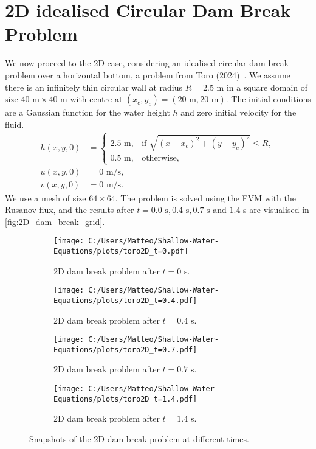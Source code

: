 \section{2D idealised Circular Dam Break Problem}\label{sec:2D_dam_break}
We now proceed to the 2D case, considering an idealised circular dam break problem over a horizontal bottom, a problem from Toro (2024)~\cite{Toro2024}.
We assume there is an infinitely thin circular wall at radius $R = 2.5$ m in a square domain of size $40 \text{ m} \times 40 \text{ m}$ with centre at $(x_c,y_c) = (20 \text{ m}, 20 \text{ m})$.
The initial conditions are a Gaussian function for the water height $h$ and zero initial velocity for the fluid.
\begin{align*}
    h(x,y,0) &= \begin{cases}
        2.5 \text{ m}, & \text{if } \sqrt{ {(x-x_c)}^2 + {(y-y_c)}^2 } \leq R, \\
        0.5 \text{ m}, & \text{otherwise},
    \end{cases} \\
    u(x,y,0) &= 0 \text{ m/s}, \\
    v(x,y,0) &= 0 \text{ m/s}.
\end{align*}
We use a mesh of size $64 \times 64$.
The problem is solved using the FVM with the Rusanov flux, and the results after $t=0.0 \text{ s}, 0.4 \text{ s}, 0.7 \text{ s}$ and $1.4$ s are visualised in \autoref{fig:2D_dam_break_grid}.
\begin{figure}[H]
    \centering
    \begin{subfigure}{0.49\textwidth}
        \centering
        \texttt{[image: C:/Users/Matteo/Shallow-Water-Equations/plots/toro2D\_t=0.pdf]}
        \caption{2D dam break problem after $t=0$ s.}\label{fig:2D_dam_break_t0}
    \end{subfigure}
    \hfill
    \begin{subfigure}{0.49\textwidth}
        \centering
        \texttt{[image: C:/Users/Matteo/Shallow-Water-Equations/plots/toro2D\_t=0.4.pdf]}
        \caption{2D dam break problem after $t=0.4$ s.}\label{fig:2D_dam_break_t0.4}
    \end{subfigure}

    \vspace{0.5cm} %

    \begin{subfigure}{0.49\textwidth}
        \centering
        \texttt{[image: C:/Users/Matteo/Shallow-Water-Equations/plots/toro2D\_t=0.7.pdf]}
        \caption{2D dam break problem after $t=0.7$ s.}\label{fig:2D_dam_break_t0.7}
    \end{subfigure}
    \hfill
    \begin{subfigure}{0.49\textwidth}
        \centering
        \texttt{[image: C:/Users/Matteo/Shallow-Water-Equations/plots/toro2D\_t=1.4.pdf]}
        \caption{2D dam break problem after $t=1.4$ s.}\label{fig:2D_dam_break_t1.4}
    \end{subfigure}

    \caption{Snapshots of the 2D dam break problem at different times.}\label{fig:2D_dam_break_grid}
\end{figure}
